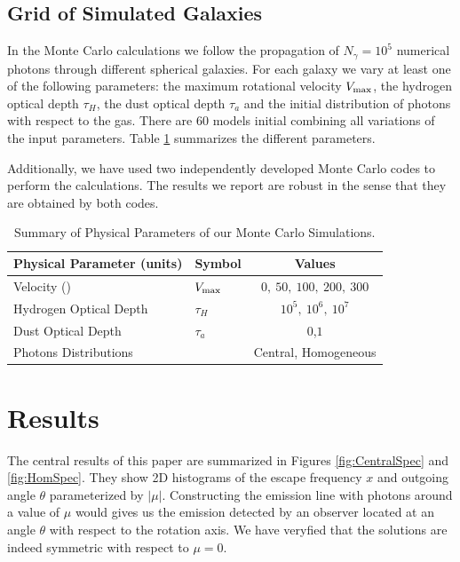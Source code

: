 \documentclass{emulateapj}
\newcommand{\kms}{{\ifmmode{{\mathrm{\,km\ s}^{-1}}}\else{\,km~s$^{-1}$}\fi}}
\begin{document}
\subsection{Grid of Simulated Galaxies}
\label{sec:models}

In the Monte Carlo calculations we follow the propagation of $N_{\gamma}=10^5$
numerical photons through different spherical galaxies. For each galaxy
we vary at least one of the following parameters: the maximum
rotational velocity $V_{\rm max}$, the hydrogen optical depth $\tau_{H}$,
the dust optical depth $\tau_{a}$ and the initial distribution of photons
with respect to the gas. There are $60$ models initial combining all
variations of the input parameters. Table \ref{table:models}
summarizes the different parameters.

Additionally, we have used two independently developed Monte Carlo
codes \citep{CLARA,DijkstraKramer} to perform the calculations. The
results we report are robust in the sense that they are obtained by
both codes.  

\begin{table}
\begin{center}
\begin{tabular}{llc}\hline\hline
Physical Parameter (units) & Symbol & Values\\\hline
Velocity (\kms) & $V_{\rm max}$&$0,\ 50,\ 100,\ 200,\ 300$\\
Hydrogen Optical Depth & $\tau_{H} $ & $10^{5},\ 10^{6},\ 10^{7}$\\
Dust Optical Depth & $\tau_{a}$ & $0$,$1$\\
Photons Distributions & & Central, Homogeneous\\\hline\hline
\end{tabular}
\caption{
  Summary of Physical Parameters of our Monte Carlo Simulations.} 
\label{table:models}
\end{center}
\end{table}




\section{Results}
\label{sec:results}

The central results of this paper are summarized in Figures
\ref{fig:CentralSpec} and \ref{fig:HomSpec}. They show 2D histograms
of the escape frequency $x$ and outgoing angle $\theta$ parameterized by
$|\mu|$. Constructing the emission line with photons around a value
of $\mu$ would gives us the emission detected by an observer located at an
angle $\theta$ with respect to the rotation axis. We have veryfied
that the solutions are indeed symmetric with respect to $\mu=0$.  
\end{document}
